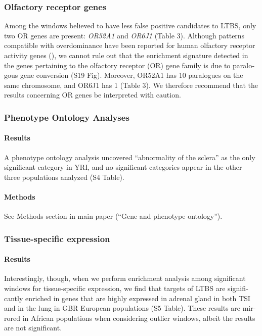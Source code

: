 \begin{refsection}
\begin{otherlanguage}{english}
\begin{footnotesize}
\subsubsection{Olfactory receptor genes}

Among the windows believed to have less false positive candidates to LTBS, only two OR genes are present: \emph{OR52A1} and \emph{OR6J1} (Table 3). Although patterns compatible with overdominance have been reported for human olfactory receptor activity genes (\cite{Alonso2008}), we cannot rule out that the enrichment signature detected in the genes pertaining to the olfactory receptor (OR) gene family is due to paralogous gene conversion (S19 Fig). Moreover, OR52A1 has 10 paralogues on the same chromosome, and OR6J1 has 1 (Table 3). We therefore recommend that the results concerning OR genes be interpreted with caution.

\subsubsection{Phenotype Ontology Analyses}

\paragraph{Results} A phenotype ontology analysis uncovered “abnormality of the sclera” as the only significant category in YRI, and no significant categories appear in the other three populations analyzed (S4 Table).

\paragraph{Methods} See Methods section in main paper (“Gene and phenotype ontology”).

\subsubsection{Tissue-specific expression}

\paragraph{Results} Interestingly, though, when we perform enrichment analysis among significant windows for tissue-specific expression, we find that targets of LTBS are significantly enriched in genes that are highly expressed in adrenal gland in both TSI and in the lung in GBR European populations (S5 Table). These results are mirrored in African populations when considering outlier windows, albeit the results are not significant. 


\end{footnotesize}
\end{otherlanguage}
\end{refsection}
